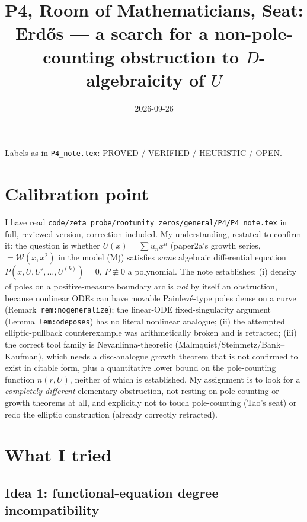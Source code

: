 \documentclass[11pt]{article}
\title{P4, Room of Mathematicians, Seat: Erd\H{o}s --- a search for a
non-pole-counting obstruction to $D$-algebraicity of $U$}
\date{2026-09-26}
\theoremstyle{remark}
\begin{document}
\maketitle

\noindent Labels as in \texttt{P4\_note.tex}: PROVED / VERIFIED / HEURISTIC / OPEN.

\section*{Calibration point}

I have read \texttt{code/zeta\_probe/rootunity\_zeros/general/P4/P4\_note.tex} in full, reviewed
version, correction included. My understanding, restated to confirm it: the question is whether
$U(x)=\sum u_nx^n$ (paper2a's growth series, $=\mathcal W(x,x^2)$ in the model (M)) satisfies
\emph{some} algebraic differential equation $P(x,U,U',\ldots,U^{(k)})=0$, $P\not\equiv0$ a
polynomial. The note establishes: (i) density of poles on a positive-measure boundary arc is
\emph{not} by itself an obstruction, because nonlinear ODEs can have movable Painlev\'e-type poles
dense on a curve (Remark~\texttt{rem:nogeneralize}); the linear-ODE fixed-singularity argument
(Lemma~\texttt{lem:odeposes}) has no literal nonlinear analogue; (ii) the attempted elliptic-pullback
counterexample was arithmetically broken and is retracted; (iii) the correct tool family is
Nevanlinna-theoretic (Malmquist/Steinmetz/Bank--Kaufman), which needs a disc-analogue growth theorem
that is not confirmed to exist in citable form, plus a quantitative lower bound on the pole-counting
function $n(r,U)$, neither of which is established. My assignment is to look for a
\emph{completely different} elementary obstruction, not resting on pole-counting or growth theorems
at all, and explicitly not to touch pole-counting (Tao's seat) or redo the elliptic construction
(already correctly retracted).

\section{What I tried}

\subsection{Idea 1: functional-equation degree incompatibility}
\end{document}
